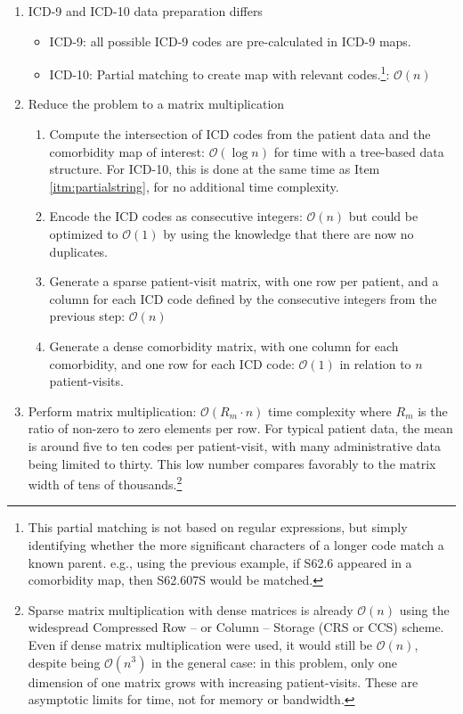 \documentclass[article]{jss}
\providecommand{\tightlist}{%
  \setlength{\itemsep}{0pt}\setlength{\parskip}{0pt}}
\begin{document}
\begin{enumerate}
\def\labelenumi{\arabic{enumi}.}
\tightlist
\item
  \label{itm:dataprep} ICD-9 and ICD-10 data preparation differs

  \begin{itemize}
  \tightlist
  \item
    ICD-9: all possible ICD-9 codes are pre-calculated in ICD-9 maps.
  \item
    \label{itm:partialstring} ICD-10: Partial matching to create map
    with relevant codes.\footnote{This partial matching is not based on
      regular expressions, but simply identifying whether the more
      significant characters of a longer code match a known parent.
      e.g., using the previous example, if S62.6 appeared in a
      comorbidity map, then S62.607S would be matched.}:
    \(\mathcal{O}(n)\)
  \end{itemize}
\item
  Reduce the problem to a matrix multiplication

  \begin{enumerate}
  \def\labelenumii{\alph{enumii}.}
  \tightlist
  \item
    \label{itm:intersect} Compute the intersection of ICD codes from the
    patient data and the comorbidity map of interest:
    \(\mathcal{O}(\log{}n)\) for time with a tree-based data structure.
    For ICD-10, this is done at the same time as Item
    \ref{itm:partialstring}, for no additional time complexity.
  \item
    \label{itm:encode} Encode the ICD codes as consecutive integers:
    \(\mathcal{O}(n)\) but could be optimized to \(\mathcal{O}(1)\) by
    using the knowledge that there are now no duplicates.
  \item
    \label{itm:gensparse} Generate a sparse patient-visit matrix, with
    one row per patient, and a column for each ICD code defined by the
    consecutive integers from the previous step: \(\mathcal{O}(n)\)
  \item
    \label{itm:gendense} Generate a dense comorbidity matrix, with one
    column for each comorbidity, and one row for each ICD code:
    \(\mathcal{O}(1)\) in relation to \(n\) patient-visits.
  \end{enumerate}
\item
  Perform matrix multiplication: \(\mathcal{O}(R_m\cdot n)\) time
  complexity where \(R_m\) is the ratio of non-zero to zero elements per
  row. For typical patient data, the mean is around five to ten codes
  per patient-visit, with many administrative data being limited to
  thirty. This low number compares favorably to the matrix width of tens
  of thousands.\footnote{Sparse matrix multiplication with dense
    matrices is already \(\mathcal{O}(n)\) using the widespread
    Compressed Row -- or Column -- Storage (CRS or CCS) scheme. Even if
    dense matrix multiplication were used, it would still be
    \(\mathcal{O}(n)\), despite being \(\mathcal{O}(n^3)\) in the
    general case: in this problem, only one dimension of one matrix
    grows with increasing patient-visits. These are asymptotic limits
    for time, not for memory or bandwidth.}
\end{enumerate}
\end{document}
